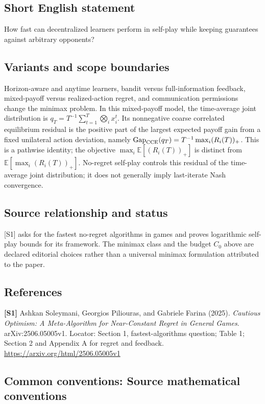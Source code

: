 \documentclass[11pt,a4paper]{article}
\begin{document}
\subsection*{Short English statement}
How fast can decentralized learners perform in self-play while keeping guarantees against arbitrary opponents?
\subsection*{Variants and scope boundaries}
Horizon-aware and anytime learners, bandit versus full-information feedback, mixed-payoff versus realized-action regret, and communication permissions change the minimax problem. In this mixed-payoff model, the time-average joint distribution is $q_T=T^{-1}\sum_{t=1}^T\bigotimes_i x_i^t$. Its nonnegative coarse correlated equilibrium residual is the positive part of the largest expected payoff gain from a fixed unilateral action deviation, namely $\operatorname{Gap}_{\rm CCE}(q_T)=T^{-1}\max_i(R_i(T))_+$. This is a pathwise identity; the objective $\max_i\mathbb E[(R_i(T))_+]$ is distinct from $\mathbb E[\max_i(R_i(T))_+]$. No-regret self-play controls this residual of the time-average joint distribution; it does not generally imply last-iterate Nash convergence.
\subsection*{Source relationship and status}
[S1] asks for the fastest no-regret algorithms in games and proves logarithmic self-play bounds for its framework. The minimax class and the budget $C_0$ above are declared editorial choices rather than a universal minimax formulation attributed to the paper.
\subsection*{References}
\begingroup\footnotesize\raggedright
{\footnotesize\raggedright
\textbf{[S1]} Ashkan Soleymani, Georgios Piliouras, and Gabriele Farina (2025). \emph{Cautious Optimism: A Meta-Algorithm for Near-Constant Regret in General Games}. arXiv:2506.05005v1. Locator: Section 1, fastest-algorithms question; Table 1; Section 2 and Appendix A for regret and feedback. \url{https://arxiv.org/html/2506.05005v1}\par}
\par\endgroup

\subsection*{Common conventions: Source mathematical conventions}
\end{document}
